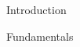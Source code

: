 \documentclass[journal]{IEEEtran}
\begin{document}
\begin{section}{Introduction}
\begin{subsection}{Fundamentals}


\end{subsection}
\end{section}
\end{document}
